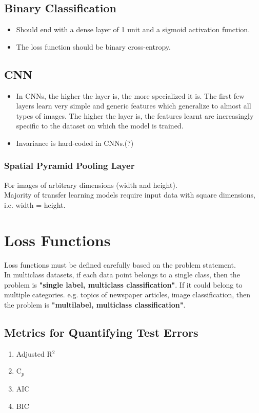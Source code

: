 \documentclass[a4paper, 12pt]{report}
\begin{document}
\section{Binary Classification}
\begin{itemize}
\item Should end with a dense layer of 1 unit and a sigmoid activation function.
\item The loss function should be binary cross-entropy.
\end{itemize}


\section{CNN}
\label{sec:cnn}
\begin{itemize}
\item In CNNs, the higher the layer is, the more specialized it is. The first few layers learn very simple and generic features which generalize to almost all types of images. The higher the layer is, the features learnt are increasingly specific to the dataset on which the model is trained.
\item {\color{red}Invariance is hard-coded in CNNs.(?)}
\end{itemize}

\subsection{Spatial Pyramid Pooling Layer}
For images of arbitrary dimensions (width and height).\\
Majority of transfer learning models require input data with square dimensions, i.e. width = height.

\chapter{Loss Functions}
Loss functions must be defined carefully based on the problem statement.\\

In multiclass datasets, if each data point belongs to a single class, then the problem is \textbf{"single label, multiclass classification"}. If it could belong to multiple categories. e.g. topics of newspaper articles, image classification, then the problem is \textbf{"multilabel, multiclass classification"}.


\section{Metrics for Quantifying Test Errors}
\begin{enumerate}
\item Adjusted R${^2}$
\item C${_p}$
\item AIC
\item BIC
\end{enumerate}
\end{document}
